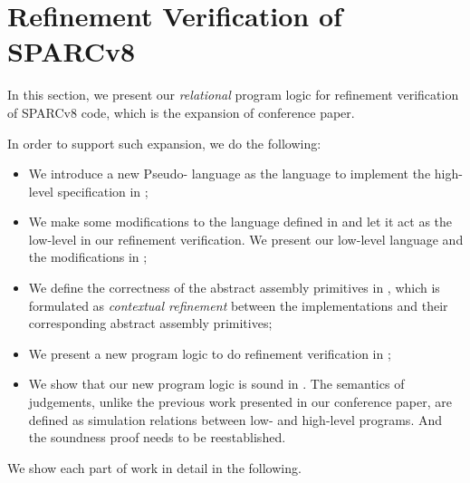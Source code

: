 \section{Refinement Verification of SPARCv8}
\label{sec:refine-verification-sparc}

In this section, we present our \textit{relational} 
program logic for refinement verification of 
SPARCv8 code, which is the expansion of conference paper. 
{\color{blue}
In order to support such expansion, we do the following:
\begin{itemize}
    \item We introduce a new Pseudo-\sparc{} language 
        as the language to implement the high-level 
        specification in 
        \Sec{\ref{subsec:High-level Pseudo-SPARCv8 Language}}; 
    \item We make some modifications to the \sparc{} 
        language defined in \Sec{\ref{sec:modeling}} and 
        let it act as the low-level in our refinement 
        verification. We present our low-level \sparc{} 
        language and the modifications in 
        \Sec{\ref{subsec:low-level SPARCv8 Program}};
    \item We define the correctness of the abstract 
        assembly primitives in 
        \Sec{\ref{subsec:correctness-primitive}}, 
        which is formulated as \textit{contextual refinement}
        between the implementations and their 
        corresponding abstract assembly primitives; 
    \item We present a new program logic to do 
        refinement verification in 
        \Sec{\ref{subsec:rellogic}}; 
    \item We show that our new program logic is 
        sound in \Sec{\ref{subsec:semantics and soundness}}.
        The semantics of judgements,
        unlike the previous work presented in our 
        conference paper, are defined as 
        simulation relations between low- and high-level 
        programs. And the soundness proof needs to 
        be reestablished. 
\end{itemize}
We show each part of work in detail in the following.
} 


